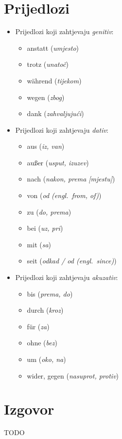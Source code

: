 \documentclass[12pt,german]{article}
\newcommand{\prijevod}[2]{\item #1 (\emph{#2})}
\begin{document}
\begin{multicols}{2}
\section{Prijedlozi}
\begin{itemize}
  \item Prijedlozi koji zahtjevaju \emph{genitiv}:
  \begin{itemize}[nolistsep, label={}]
      \prijevod{anstatt}{umjesto}
      \prijevod{trotz}{unatoč}
      \prijevod{w\"ahrend}{tijekom}
      \prijevod{wegen}{zbog}
      \prijevod{dank}{zahvaljujući}
  \end{itemize}

  \item Prijedlozi koji zahtjevaju \emph{dativ}:
  \begin{itemize}[nolistsep, label={}]
      \prijevod{aus}{iz, van}
      \prijevod{au{\ss}er}{usput, izuzev}
      \prijevod{nach}{nakon, prema [mjestu]}
      \prijevod{von}{od (engl.\ \emph{from, of})}
      \prijevod{zu}{do, prema}
      \prijevod{bei}{uz, pri}
      \prijevod{mit}{sa}
      \prijevod{seit}{odkad / od (engl.\ \emph{since})}
  \end{itemize}

  \item Prijedlozi koji zahtjevaju \emph{akuzativ}:
  \begin{itemize}[nolistsep, label={}]
      \prijevod{bis}{prema, do}
      \prijevod{durch}{kroz}
      \prijevod{f\"ur}{za}
      \prijevod{ohne}{bez}
      \prijevod{um}{oko, na}
      \prijevod{wider, gegen}{nasuprot, protiv}
  \end{itemize}
\end{itemize}

\section{Izgovor}
TODO
% 

\end{multicols}
\end{document}
